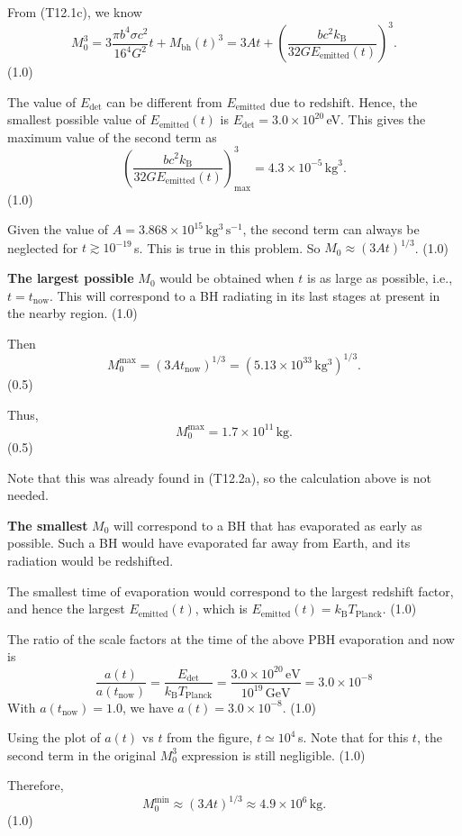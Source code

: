 \begin{description}
  From (T12.1c), we know
  \[
    M_0^3 = 3\frac{\pi b^4 \sigma c^2}{16^4 G^2} t + M_{\mathrm{bh}}(t)^3
    = 3At + \left(\frac{b c^2 k_{\mathrm{B}}}
      {32 G E_{\mathrm{emitted}}(t)}\right)^3.
  \]
  \hfill(1.0)

  The value of $E_{\mathrm{det}}$ can be different from
  $E_{\mathrm{emitted}}$ due to redshift. Hence, the smallest possible value
  of $E_{\mathrm{emitted}}(t)$ is
  $E_{\mathrm{det}} = 3.0 \times 10^{20}$\,eV. This gives the maximum value
  of the second term as
  \[
    \left(\frac{b c^2 k_{\mathrm{B}}}
      {32 G E_{\mathrm{emitted}}(t)}\right)^3_{\mathrm{max}}
    = 4.3 \times 10^{-5}\,\mathrm{kg}^3.
  \]
  \hfill(1.0)

  Given the value of $A = 3.868 \times 10^{15}\,\mathrm{kg^3\,s^{-1}}$, the
  second term can always be neglected for $t \gtrsim 10^{-19}$\,s. This is
  true in this problem. So $M_0 \approx (3At)^{1/3}$. \hfill(1.0)

  \textbf{The largest possible} $M_0$ would be obtained when $t$ is as large
  as possible, i.e., $t = t_{\mathrm{now}}$. This will correspond to a BH
  radiating in its last stages at present in the nearby region. \hfill(1.0)

  Then
  \[
    M_0^{\mathrm{max}} = (3At_{\mathrm{now}})^{1/3}
    = (5.13 \times 10^{33}\,\mathrm{kg^3})^{1/3}.
  \]
  \hfill(0.5)

  Thus,
  \[
    M_0^{\mathrm{max}} = 1.7 \times 10^{11}\,\mathrm{kg}.
  \]
  \hfill(0.5)

  Note that this was already found in (T12.2a), so the calculation above is
  not needed.

  \textbf{The smallest} $M_0$ will correspond to a BH that has evaporated as
  early as possible. Such a BH would have evaporated far away from Earth,
  and its radiation would be redshifted.

  The smallest time of evaporation would correspond to the largest redshift
  factor, and hence the largest $E_{\mathrm{emitted}}(t)$, which is
  $E_{\mathrm{emitted}}(t) = k_{\mathrm{B}} T_{\mathrm{Planck}}$.
  \hfill(1.0)

  The ratio of the scale factors at the time of the above PBH evaporation
  and now is
  \[
    \frac{a(t)}{a(t_{\mathrm{now}})}
    = \frac{E_{\mathrm{det}}}{k_{\mathrm{B}} T_{\mathrm{Planck}}}
    = \frac{3.0 \times 10^{20}\,\mathrm{eV}}{10^{19}\,\mathrm{GeV}}
    = 3.0 \times 10^{-8}
  \]
  With $a(t_{\mathrm{now}}) = 1.0$, we have
  $a(t) = 3.0 \times 10^{-8}$. \hfill(1.0)

  Using the plot of $a(t)$ vs $t$ from the figure, $t \simeq 10^{4}$\,s.
  Note that for this $t$, the second term in the original $M_0^3$ expression
  is still negligible. \hfill(1.0)

  Therefore,
  \[
    M_0^{\mathrm{min}} \approx (3At)^{1/3}
    \approx 4.9 \times 10^{6}\,\mathrm{kg}.
  \]
  \hfill(1.0)
\end{description}

